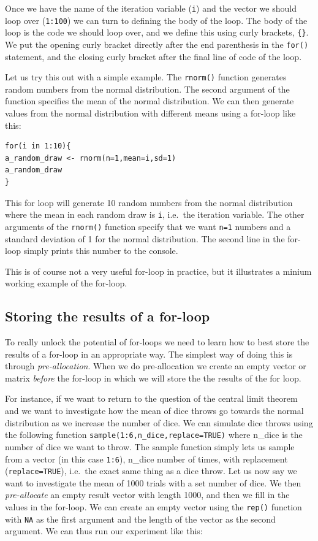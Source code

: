\documentclass[
]{book}
\begin{document}
Once we have the name of the iteration variable (\texttt{i}) and the vector we should loop over (\texttt{1:100}) we can turn to defining the body of the loop. The body of the loop is the code we should loop over, and we define this using curly brackets, \texttt{\{\}}. We put the opening curly bracket directly after the end parenthesis in the \texttt{for()} statement, and the closing curly bracket after the final line of code of the loop.

Let us try this out with a simple example. The \texttt{rnorm()} function generates random numbers from the normal distribution. The second argument of the function specifies the mean of the normal distribution. We can then generate values from the normal distribution with different means using a for-loop like this:

\begin{verbatim}
for(i in 1:10){
a_random_draw <- rnorm(n=1,mean=i,sd=1)
a_random_draw
}
\end{verbatim}

This for loop will generate 10 random numbers from the normal distribution where the mean in each random draw is \texttt{i}, i.e.~the iteration variable. The other arguments of the \texttt{rnorm()} function specify that we want \texttt{n=1} numbers and a standard deviation of 1 for the normal distribution. The second line in the for-loop simply prints this number to the console.

This is of course not a very useful for-loop in practice, but it illustrates a minium working example of the for-loop.

\hypertarget{storing-the-results-of-a-for-loop}{%
\subsection{Storing the results of a for-loop}\label{storing-the-results-of-a-for-loop}}

To really unlock the potential of for-loops we need to learn how to best store the results of a for-loop in an appropriate way. The simplest way of doing this is through \emph{pre-allocation}. When we do pre-allocation we create an empty vector or matrix \emph{before} the for-loop in which we will store the the results of the for loop.

For instance, if we want to return to the question of the central limit theorem and we want to investigate how the mean of dice throws go towards the normal distribution as we increase the number of dice. We can simulate dice throws using the following function \texttt{sample(1:6,n\_dice,replace=TRUE)} where n\_dice is the number of dice we want to throw. The sample function simply lets us sample from a vector (in this case \texttt{1:6}), n\_dice number of times, with replacement (\texttt{replace=TRUE}), i.e.~the exact same thing as a dice throw. Let us now say we want to investigate the mean of 1000 trials with a set number of dice. We then \emph{pre-allocate} an empty result vector with length 1000, and then we fill in the values in the for-loop. We can create an empty vector using the \texttt{rep()} function with \texttt{NA} as the first argument and the length of the vector as the second argument. We can thus run our experiment like this:
\end{document}
